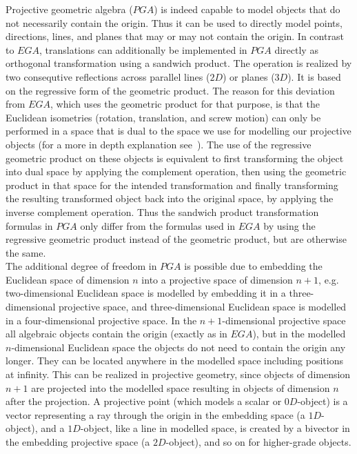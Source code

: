 Projective geometric algebra ($PGA$) is indeed capable to model objects that do not
necessarily contain the origin. Thus it can be used to directly model points, directions,
lines, and planes that may or may not contain the origin. In contrast to $EGA$,
translations can additionally be implemented in $PGA$ directly as orthogonal
transformation using a sandwich product. The operation is realized by two consequtive
reflections across parallel lines ($2D$) or planes ($3D$). It is based on the regressive
form of the geometric product. The reason for this deviation from $EGA$, which uses the
geometric product for that purpose, is that the Euclidean isometries (rotation,
translation, and screw motion) can only be performed in a space that is dual to the space
we use for modelling our projective objects (for a more in depth explanation
see~\cite{Lengyel_pga-illuminated:2024}). The use of the regressive geometric product on
these objects is equivalent to first transforming the object into dual space by applying
the complement operation, then using the geometric product in that space for the intended
transformation and finally transforming the resulting transformed object back into the
original space, by applying the inverse complement operation. Thus the sandwich product
transformation formulas in $PGA$ only differ from the formulas used in $EGA$ by using the
regressive geometric product instead of the geometric product, but are otherwise the same.
\\

The additional degree of freedom in $PGA$ is possible due to embedding the Euclidean space
of dimension $n$ into a projective space of dimension $n+1$, e.g. two-dimensional
Euclidean space is modelled by embedding it in a three-dimensional projective space, and
three-dimensional Euclidean space is modelled in a four-dimensional projective space. In
the $n+1$-dimensional projective space all algebraic objects contain the origin (exactly
as in $EGA$), but in the modelled $n$-dimensional Euclidean space the objects do not need
to contain the origin any longer. They can be located anywhere in the modelled space
including positions at infinity. This can be realized in projective geometry, since
objects of dimension $n+1$ are projected into the modelled space resulting in objects of
dimension $n$ after the projection. A projective point (which models a scalar or
$0D$-object) is a vector representing a ray through the origin in the embedding space (a
$1D$-object), and a $1D$-object, like a line in modelled space, is created by a bivector
in the embedding projective space (a $2D$-object), and so on for higher-grade objects. \\


